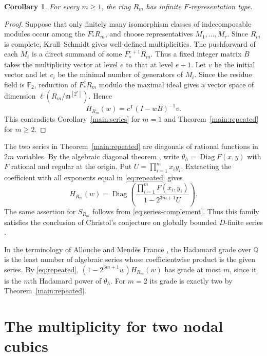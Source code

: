 \documentclass[11pt,a4paper,reqno]{amsart}
\numberwithin{equation}{section}
\theoremstyle{plain}
\newtheorem{corollary}[theorem]{Corollary}
\begin{document}
\begin{corollary}
For every $m\ge1$, the ring $R_m$ has infinite $F$-representation type.
\end{corollary}
\begin{proof}
Suppose that only finitely many isomorphism classes of indecomposable modules occur among the $F_*^eR_m$, and choose representatives $M_1,\ldots,M_r$. Since $R_m$ is complete, Krull--Schmidt gives well-defined multiplicities. The pushforward of each $M_i$ is a direct summand of some $F_*^{e+1}R_m$. Thus a fixed integer matrix $B$ takes the multiplicity vector at level $e$ to that at level $e+1$. Let $v$ be the initial vector and let $c_i$ be the minimal number of generators of $M_i$. Since the residue field is $\mathbb F_2$, reduction of $F_*^eR_m$ modulo the maximal ideal gives a vector space of dimension $\ell(R_m/\mathfrak m^{[2^e]})$. Hence
\[
 H_{R_m}(w)=c^{\mathsf T}(I-wB)^{-1}v.
\]
This contradicts Corollary~\ref{main:series} for $m=1$ and Theorem~\ref{main:repeated} for $m\ge2$.
\end{proof}

The two series in Theorem~\ref{main:repeated} are diagonals of rational functions in $2m$ variables. By the algebraic diagonal theorem \cite{DL}, write $\theta_h=\operatorname{Diag} F(x,y)$ with $F$ rational and regular at the origin. Put $U=\prod_{i=1}^m x_i y_i$. Extracting the coefficient with all exponents equal in \eqref{eq:repeated} gives
\[
 H_{R_m}(w)=\operatorname{Diag}\left(
 \frac{\prod_{i=1}^m F(x_i,y_i)}{1-2^{3m+1}U}\right).
\]
The same assertion for $S_{R_m}$ follows from \eqref{eq:series-complement}. Thus this family satisfies the conclusion of Christol's conjecture on globally bounded $D$-finite series \cite{Christol}.

In the terminology of Allouche and Mend\`es France \cite{AMF}, the Hadamard grade over $\mathbb Q$ is the least number of algebraic series whose coefficientwise product is the given series. By \eqref{eq:repeated}, $(1-2^{3m+1}w)H_{R_m}(w)$ has grade at most $m$, since it is the $m$th Hadamard power of $\theta_h$. For $m=2$ its grade is exactly two by Theorem~\ref{main:repeated}.

\section{The multiplicity for two nodal cubics}\label{sec:r2}
\end{document}
